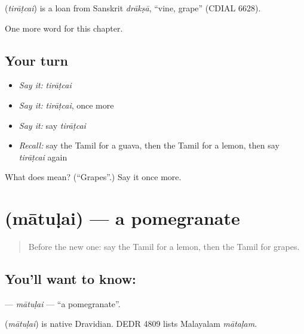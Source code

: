 \begin{cousinweb}
\textbf{} (\emph{tirāṭcai}) is a loan from Sanskrit \emph{drākṣā}, \textquotedblleft{}vine, grape\textquotedblright{} (CDIAL 6628).
\end{cousinweb}

\begin{grammarlens}[title={What you've built}]
One more word for this chapter.
\end{grammarlens}

\subsection*{Your turn}
\begin{itemize}
\raggedright
  \item \emph{Say it:} \emph{tirāṭcai}
  \item \emph{Say it:} \emph{tirāṭcai}, once more
  \item \emph{Say it:} say \emph{tirāṭcai}
  \item \emph{Recall:} say the Tamil for a guava, then the Tamil for a lemon, then say \emph{tirāṭcai} again
\end{itemize}

\begin{tcolorbox}[breakable,colback=teal!4,colframe=teal!35!black,title={Before you move on}]
What does  mean? (\textquotedblleft{}Grapes\textquotedblright{}.) Say it once more.
\end{tcolorbox}
\section[\texorpdfstring{\ta{மாதுளை} (mātuḷai)}{மாதுளை (mātuḷai)}]{ (mātuḷai) — a pomegranate}

\label{lesson:TA-C140-matulai}



\begin{quote}
Before the new one: say the Tamil for a lemon, then the Tamil for grapes.
\end{quote}

\subsection*{You'll want to know: }
\textbf{} — \emph{mātuḷai} — \textquotedblleft{}a pomegranate\textquotedblright{}.

\begin{cousinweb}
\textbf{} (\emph{mātuḷai}) is native Dravidian. DEDR 4809 lists Malayalam \emph{mātaḷam}.
\end{cousinweb}

